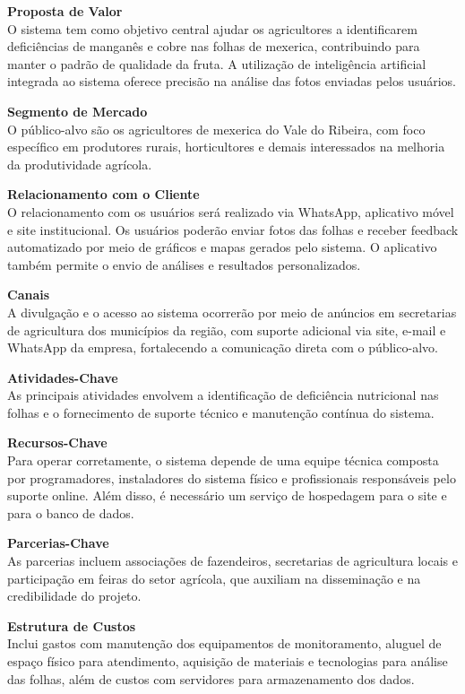 \medskip
\noindent\textbf{Proposta de Valor}\\
O sistema tem como objetivo central ajudar os agricultores a identificarem deficiências de manganês e cobre nas folhas de mexerica, contribuindo para manter o padrão de qualidade da fruta. A utilização de inteligência artificial integrada ao sistema oferece precisão na análise das fotos enviadas pelos usuários.

\medskip
\noindent\textbf{Segmento de Mercado}\\
O público-alvo são os agricultores de mexerica do Vale do Ribeira, com foco específico em produtores rurais, horticultores e demais interessados na melhoria da produtividade agrícola.

\medskip
\noindent\textbf{Relacionamento com o Cliente}\\
O relacionamento com os usuários será realizado via WhatsApp, aplicativo móvel e site institucional. Os usuários poderão enviar fotos das folhas e receber feedback automatizado por meio de gráficos e mapas gerados pelo sistema. O aplicativo também permite o envio de análises e resultados personalizados.

\medskip
\noindent\textbf{Canais}\\
A divulgação e o acesso ao sistema ocorrerão por meio de anúncios em secretarias de agricultura dos municípios da região, com suporte adicional via site, e-mail e WhatsApp da empresa, fortalecendo a comunicação direta com o público-alvo.

\medskip
\noindent\textbf{Atividades-Chave}\\
As principais atividades envolvem a identificação de deficiência nutricional nas folhas e o fornecimento de suporte técnico e manutenção contínua do sistema.

\medskip
\noindent\textbf{Recursos-Chave}\\
Para operar corretamente, o sistema depende de uma equipe técnica composta por programadores, instaladores do sistema físico e profissionais responsáveis pelo suporte online. Além disso, é necessário um serviço de hospedagem para o site e para o banco de dados.

\medskip
\noindent\textbf{Parcerias-Chave}\\
As parcerias incluem associações de fazendeiros, secretarias de agricultura locais e participação em feiras do setor agrícola, que auxiliam na disseminação e na credibilidade do projeto.

\medskip
\noindent\textbf{Estrutura de Custos}\\
Inclui gastos com manutenção dos equipamentos de monitoramento, aluguel de espaço físico para atendimento, aquisição de materiais e tecnologias para análise das folhas, além de custos com servidores para armazenamento dos dados.

